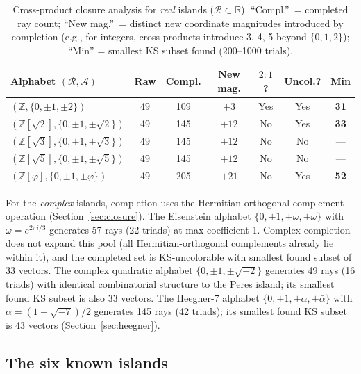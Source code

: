 \documentclass[12pt,a4paper]{article}
\newcommand{\R}{\mathbb{R}}
\newcommand{\Z}{\mathbb{Z}}
\begin{document}
\begin{table}[ht]
\centering
\caption{Cross-product closure analysis for \emph{real} islands ($\mathcal{R} \subset \R$). ``Compl.''\ = completed ray count; ``New mag.''\ = distinct new coordinate magnitudes introduced by completion (e.g., for integers, cross products introduce 3, 4, 5 beyond $\{0,1,2\}$); ``Min'' = smallest KS subset found (200--1000 trials).}
\label{tab:closure}
\small
\begin{tabular}{lcccccc}
\toprule
Alphabet $(\mathcal{R}, \mathcal{A})$ & Raw & Compl. & New mag. & $2{:}1$? & Uncol.? & Min \\
\midrule
$(\Z, \{0,\pm 1,\pm 2\})$ & 49 & 109 & $+3$ & Yes & Yes & \textbf{31} \\
$(\Z[\sqrt{2}], \{0,\pm 1,\pm\!\sqrt{2}\})$ & 49 & 145 & $+12$ & No & Yes & \textbf{33} \\
$(\Z[\sqrt{3}], \{0,\pm 1,\pm\!\sqrt{3}\})$ & 49 & 145 & $+12$ & No & No & --- \\
$(\Z[\sqrt{5}], \{0,\pm 1,\pm\!\sqrt{5}\})$ & 49 & 145 & $+12$ & No & No & --- \\
$(\Z[\varphi], \{0,\pm 1,\pm\varphi\})$ & 49 & 205 & $+21$ & No & Yes & \textbf{52} \\
\bottomrule
\end{tabular}

\medskip
\noindent For the \emph{complex} islands, completion uses the Hermitian orthogonal-complement operation (Section~\ref{sec:closure}). The Eisenstein alphabet $\{0, \pm 1, \pm\omega, \pm\bar\omega\}$ with $\omega = e^{2\pi i/3}$ generates 57 rays (22 triads) at max coefficient 1. Complex completion does not expand this pool (all Hermitian-orthogonal complements already lie within it), and the completed set is KS-uncolorable with smallest found subset of 33 vectors. The complex quadratic alphabet $\{0, \pm 1, \pm\sqrt{-2}\}$ generates 49 rays (16 triads) with identical combinatorial structure to the Peres island; its smallest found KS subset is also 33 vectors. The Heegner-7 alphabet $\{0, \pm 1, \pm\alpha, \pm\bar\alpha\}$ with $\alpha = (1+\sqrt{-7})/2$ generates 145 rays (42 triads); its smallest found KS subset is 43 vectors (Section~\ref{sec:heegner}).
\end{table}

\subsection{The six known islands}\label{sec:sixislands}
\end{document}
